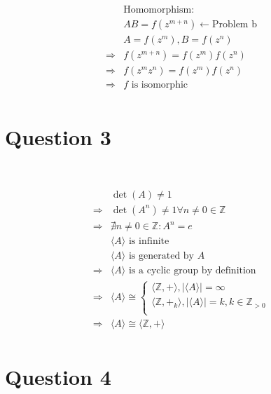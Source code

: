 \documentclass{article}
\begin{document}
\begin{equation*}
    \begin{split}
        &\text{Homomorphism}:\\
        &AB=f(z^{m+n})\leftarrow \text{Problem b}\\
        &A=f(z^m),B=f(z^n)\\
        \Rightarrow&f(z^{m+n})=f(z^m)f(z^n)\\
        \Rightarrow&f(z^mz^n)=f(z^m)f(z^n)\\
        \Rightarrow&f\text{ is isomorphic}\\
    \end{split}
\end{equation*}

\newpage

\section*{Question 3}

~

\begin{equation*}
    \begin{split}
        &\det (A)\ne 1\\
        \Rightarrow&\det(A^n)\ne1\forall n\ne 0\in \mathbb{Z} \\
        \Rightarrow&\nexists n\ne 0\in \mathbb{Z}:A^n=e\\
        &\langle A\rangle\text{ is infinite}\\
        &\langle A\rangle\text{ is generated by }A\\
        \Rightarrow&\langle A\rangle\text{ is a cyclic group by definition}\\
        \Rightarrow&\langle A\rangle\cong \begin{cases*}
            \langle\mathbb{Z} ,+\rangle,|\langle A\rangle|=\infty\\
            \langle\mathbb{Z} ,+_k\rangle,|\langle A\rangle|=k,k\in\mathbb{Z} _{>0}\\
        \end{cases*}\\
        \Rightarrow&\langle A\rangle\cong \langle\mathbb{Z} ,+\rangle\\
    \end{split}
\end{equation*}

\newpage

\section*{Question 4}
\end{document}
